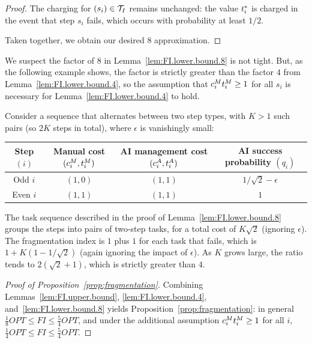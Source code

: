 \begin{proof}
    The charging for $(s_i) \in \mathcal{T}_I$ remains unchanged: the value $t^*_{i}$ is charged in the event that step $s_i$ fails, which occurs with probability at least $1/2$.

    Taken together, we obtain our desired $8$ approximation.
\end{proof}

We suspect the factor of $8$ in Lemma~\ref{lem:FI.lower.bound.8} is not tight.
But, as the following example shows, the factor is strictly greater than the factor $4$ from Lemma~\ref{lem:FI.lower.bound.4}, so the assumption that $c^{M}_{i}t^{M}_{i} \geq 1$ for all $s_i$ is necessary for Lemma~\ref{lem:FI.lower.bound.4} to hold.

\begin{example}
\label{ex:FI.necessity}
Consider a sequence that alternates between two step types, with $K > 1$ such pairs (so $2K$ steps in total), where $\epsilon$ is vanishingly small:
\begin{center}
\begin{tabular}{c|ccc}
\toprule
\makecell{Step\\$(i)$} & \makecell{Manual cost\\$(c^{M}_{i}, t^{M}_{i})$} & \makecell{AI management cost\\$(c^{A}_{i}, t^{A}_{i})$} & \makecell{AI success probability\\$(q_i)$} \\
\midrule
Odd $i$ & $(1, 0)$ & $(1, 1)$ & $1/\sqrt{2}-\epsilon$ \\
Even $i$ & $(1, 1)$ & $(1, 1)$ & $1$ \\
\bottomrule
\end{tabular}
\end{center}
The task sequence described in the proof of Lemma~\ref{lem:FI.lower.bound.8} groups the steps into pairs of two-step tasks, for a total cost of $K \sqrt{2}$ (ignoring $\epsilon$).
The fragmentation index is $1$ plus $1$ for each task that fails, which is $1 + K(1 - 1/\sqrt{2})$ (again ignoring the impact of $\epsilon$).
As $K$ grows large, the ratio tends to $2(\sqrt{2}+1)$, which is strictly greater than $4$.
\end{example}

\begin{proof}[Proof of Proposition~\ref{prop:fragmentation}]
Combining Lemmas~\ref{lem:FI.upper.bound}, \ref{lem:FI.lower.bound.4}, and~\ref{lem:FI.lower.bound.8} yields Proposition~\ref{prop:fragmentation}: in general $\tfrac{1}{8}OPT \leq FI \leq \tfrac{5}{4}OPT$, and under the additional assumption $c^{M}_{i}t^{M}_{i} \geq 1$ for all $i$, $\tfrac{1}{4}OPT \leq FI \leq \tfrac{5}{4}OPT$.
\end{proof}

